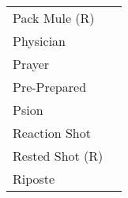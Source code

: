 \begin{table}[]
\begin{tabular}{ll}
    Pack Mule (R)      &                                                                                                                                                                                                                                                                                   \\
    Physician          &                                                                                                                                                                                                                                                                                   \\
    Prayer             &                                                                                                                                                                                                                                                                                   \\
    Pre-Prepared       &                                                                                                                                                                                                                                                                                   \\
    Psion              &                                                                                                                                                                                                                                                                                   \\
    Reaction Shot      &                                                                                                                                                                                                                                                                                   \\
    Rested Shot (R)    &                                                                                                                                                                                                                                                                                   \\
    Riposte            &                                                                                                                                                                                                                                                                                   \\

\end{tabular}
\end{table}
